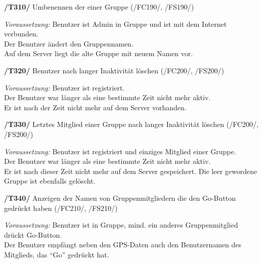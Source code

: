 \textbf{/T310/} Umbenennen der einer Gruppe (/FC190/, /FS190/)\\
\begin{center}
\vspace{-\parskip}
\begin{minipage}[t]{0.9\textwidth}
\emph{Voraussetzung:} Benutzer ist Admin in Gruppe und ist mit dem Internet verbunden.\\
Der Benutzer ändert den Gruppennamen.\\
Auf dem Server liegt die alte Gruppe mit neuem Namen vor.\\
\end{minipage}
\end{center}

\textbf{/T320/} Benutzer nach langer Inaktivität löschen (/FC200/, /FS200/)\\
\begin{center}
\vspace{-\parskip}
\begin{minipage}[t]{0.9\textwidth}
\emph{Voraussetzung:} Benutzer ist registriert.\\
Der Benutzer war länger als eine bestimmte Zeit nicht mehr aktiv.\\
Er ist nach der Zeit nicht mehr auf dem Server vorhanden.\\
\end{minipage}
\end{center}

\textbf{/T330/} Letztes Mitglied einer Gruppe nach langer Inaktivität löschen (/FC200/, /FS200/)\\
\begin{center}
\vspace{-\parskip}
\begin{minipage}[t]{0.9\textwidth}
\emph{Voraussetzung:} Benutzer ist registriert und einziges Mitglied einer Gruppe.\\
Der Benutzer war länger als eine bestimmte Zeit nicht mehr aktiv.\\
Er ist nach dieser Zeit nicht mehr auf dem Server gespeichert. Die leer gewordene Gruppe
ist ebenfalls gelöscht.\\
\end{minipage}
\end{center}

\textbf{/T340/} Anzeigen der Namen von Gruppenmitgliedern die den Go-Button gedrückt haben (/FC210/, /FS210/)\\
\begin{center}
\vspace{-\parskip}
\begin{minipage}[t]{0.9\textwidth}
\emph{Voraussetzung:} Benutzer ist in Gruppe, mind. ein anderes Gruppenmitglied drückt Go-Button.\\
Der Benutzer empfängt neben den GPS-Daten auch den Benutzernamen des Mitglieds, das "`Go"' gedrückt hat.\\
\end{minipage}
\end{center}

